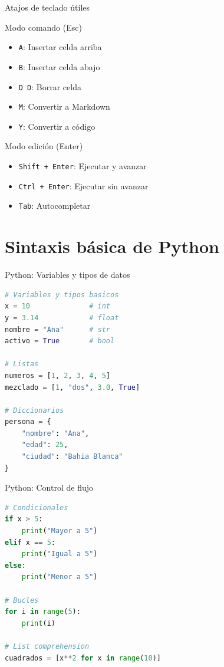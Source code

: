 \documentclass[aspectratio=169]{beamer}
\begin{document}
\begin{frame}{Atajos de teclado útiles}
\begin{block}{Modo comando (Esc)}
\begin{itemize}
    \item \texttt{A}: Insertar celda arriba
    \item \texttt{B}: Insertar celda abajo
    \item \texttt{D D}: Borrar celda
    \item \texttt{M}: Convertir a Markdown
    \item \texttt{Y}: Convertir a código
\end{itemize}
\end{block}

\begin{block}{Modo edición (Enter)}
\begin{itemize}
    \item \texttt{Shift + Enter}: Ejecutar y avanzar
    \item \texttt{Ctrl + Enter}: Ejecutar sin avanzar
    \item \texttt{Tab}: Autocompletar
\end{itemize}
\end{block}
\end{frame}

\section{Sintaxis básica de Python}

\begin{frame}[fragile]{Python: Variables y tipos de datos}
\begin{lstlisting}[language=Python]
# Variables y tipos basicos
x = 10              # int
y = 3.14            # float
nombre = "Ana"      # str
activo = True       # bool

# Listas
numeros = [1, 2, 3, 4, 5]
mezclado = [1, "dos", 3.0, True]

# Diccionarios
persona = {
    "nombre": "Ana",
    "edad": 25,
    "ciudad": "Bahia Blanca"
}
\end{lstlisting}
\end{frame}

\begin{frame}[fragile]{Python: Control de flujo}
\begin{lstlisting}[language=Python]
# Condicionales
if x > 5:
    print("Mayor a 5")
elif x == 5:
    print("Igual a 5")
else:
    print("Menor a 5")

# Bucles
for i in range(5):
    print(i)

# List comprehension
cuadrados = [x**2 for x in range(10)]
\end{lstlisting}
\end{frame}
\end{document}

